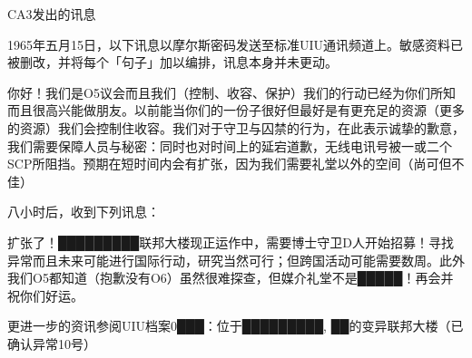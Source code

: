 \hr

CA3发出的讯息

1965年五月15日，以下讯息以摩尔斯密码发送至标准UIU通讯频道上。敏感资料已被删改，并将每个「句子」加以编排，讯息本身并未更动。

\begin{scpbox}

你好！我们是O5议会而且我们（控制、收容、保护）我们的行动已经为你们所知而且很高兴能做朋友。以前能当你们的一份子很好但最好是有更充足的资源（更多的资源）我们会控制住收容。我们对于守卫与囚禁的行为，在此表示诚挚的歉意，我们需要保障人员与秘密：同时也对时间上的延宕道歉，无线电讯号被一或二个SCP所阻挡。预期在短时间内会有扩张，因为我们需要礼堂以外的空间（尚可但不佳）

\end{scpbox}

八小时后，收到下列讯息：

\begin{scpbox}

扩张了！█████████联邦大楼现正运作中，需要博士守卫D人开始招募！寻找异常而且未来可能进行国际行动，研究当然可行；但跨国活动可能需要数周。此外我们O5都知道（抱歉没有O6）虽然很难探查，但媒介礼堂不是█████！再会并祝你们好运。

\end{scpbox}

更进一步的资讯参阅UIU档案0███：位于█████████, ██的变异联邦大楼（已确认异常10号）

